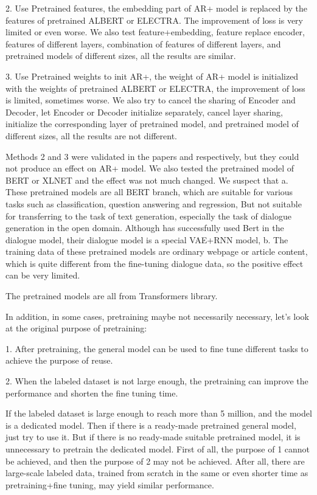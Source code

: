 \documentclass[letterpaper]{article} %
\DeclareRobustCommand{\citeext}[1]{\cite[#1]{#1}}
\begin{document}
2. Use Pretrained features\citeext{Devlin2019}, the embedding part of AR+ model is replaced by the features of pretrained ALBERT\citeext{Lan2019} or ELECTRA\citeext{Clark2020}. The improvement of loss is very limited or even worse. We also test feature+embedding, feature replace encoder, features of different layers, combination of features of different layers, and pretrained models of different sizes, all the results are similar. 

3. Use Pretrained weights to init AR+\citeext{Ziegler2019}, the weight of AR+ model is initialized with the weights of pretrained ALBERT or ELECTRA, the improvement of loss is limited, sometimes worse. We also try to cancel the sharing of Encoder and Decoder, let Encoder or Decoder initialize separately, cancel layer sharing, initialize the corresponding layer of pretrained model, and pretrained model of different sizes, all the results are not different. 

Methods 2 and 3 were validated in the papers \citeext{Devlin2019} and \citeext{Zhao2019} respectively, but they could not produce an effect on AR+ model. We also tested the pretrained model of BERT or XLNET\citeext{Yang2019} and the effect was not much changed. We suspect that a. These pretrained models are all BERT branch, which are suitable for various tasks such as classification, question answering and regression, But not suitable for transferring to the task of text generation, especially the task of dialogue generation in the open domain. Although \citeext{Zhao2019} has successfully used Bert in the dialogue model, their dialogue model is a special VAE+RNN model, b. The training data of these pretrained models are ordinary webpage or article content, which is quite different from the fine-tuning dialogue data, so the positive effect can be very limited. 

The pretrained models are all from Transformers library\citeext{Wolf2019HuggingFacesTS}.

In addition, in some cases, pretraining maybe not necessarily necessary, let's look at the original purpose of pretraining: 

1. After pretraining, the general model can be used to fine tune different tasks to achieve the purpose of reuse.

2. When the labeled dataset is not large enough, the pretraining can improve the performance and shorten the fine tuning time.

If the labeled dataset is large enough to reach more than 5 million, and the model is a dedicated model. Then if there is a ready-made pretrained general model, just try to use it. But if there is no ready-made suitable pretrained model, it is unnecessary to pretrain the dedicated model. First of all, the purpose of 1 cannot be achieved, and then the purpose of 2 may not be achieved. After all, there are large-scale labeled data, trained from scratch in the same or even shorter time as pretraining+fine tuning, may yield similar performance.
\end{document}

